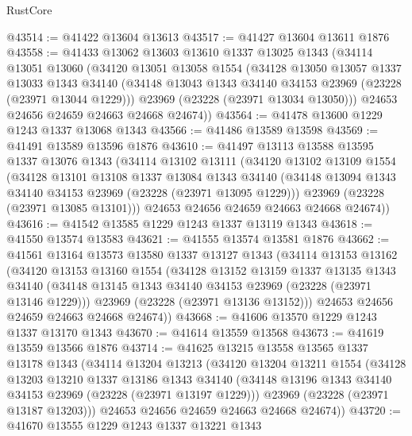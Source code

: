 \begin{lexlean}{RustCore}
\begin{coremodule}
@43514 := @41422 @13604 @13613
@43517 := @41427 @13604 @13611 @1876
@43558 := @41433
    @13062
    @13603
    @13610
    @1337
    @13025
    @1343
    (@34114
      @13051
      @13060
      (@34120
        @13051
        @13058
        @1554
        (@34128
          @13050
          @13057
          @1337
          @13033
          @1343
          @34140
          (@34148 @13043 @1343 @34140 @34153 @23969 (@23228 (@23971 @13044 @1229)))
          @23969
          (@23228 (@23971 @13034 @13050)))
        @24653
        @24656
        @24659
        @24663
        @24668
        @24674))
@43564 := @41478 @13600 @1229 @1243 @1337 @13068 @1343
@43566 := @41486 @13589 @13598
@43569 := @41491 @13589 @13596 @1876
@43610 := @41497
    @13113
    @13588
    @13595
    @1337
    @13076
    @1343
    (@34114
      @13102
      @13111
      (@34120
        @13102
        @13109
        @1554
        (@34128
          @13101
          @13108
          @1337
          @13084
          @1343
          @34140
          (@34148 @13094 @1343 @34140 @34153 @23969 (@23228 (@23971 @13095 @1229)))
          @23969
          (@23228 (@23971 @13085 @13101)))
        @24653
        @24656
        @24659
        @24663
        @24668
        @24674))
@43616 := @41542 @13585 @1229 @1243 @1337 @13119 @1343
@43618 := @41550 @13574 @13583
@43621 := @41555 @13574 @13581 @1876
@43662 := @41561
    @13164
    @13573
    @13580
    @1337
    @13127
    @1343
    (@34114
      @13153
      @13162
      (@34120
        @13153
        @13160
        @1554
        (@34128
          @13152
          @13159
          @1337
          @13135
          @1343
          @34140
          (@34148 @13145 @1343 @34140 @34153 @23969 (@23228 (@23971 @13146 @1229)))
          @23969
          (@23228 (@23971 @13136 @13152)))
        @24653
        @24656
        @24659
        @24663
        @24668
        @24674))
@43668 := @41606 @13570 @1229 @1243 @1337 @13170 @1343
@43670 := @41614 @13559 @13568
@43673 := @41619 @13559 @13566 @1876
@43714 := @41625
    @13215
    @13558
    @13565
    @1337
    @13178
    @1343
    (@34114
      @13204
      @13213
      (@34120
        @13204
        @13211
        @1554
        (@34128
          @13203
          @13210
          @1337
          @13186
          @1343
          @34140
          (@34148 @13196 @1343 @34140 @34153 @23969 (@23228 (@23971 @13197 @1229)))
          @23969
          (@23228 (@23971 @13187 @13203)))
        @24653
        @24656
        @24659
        @24663
        @24668
        @24674))
@43720 := @41670 @13555 @1229 @1243 @1337 @13221 @1343

\end{coremodule}
\end{lexlean}
